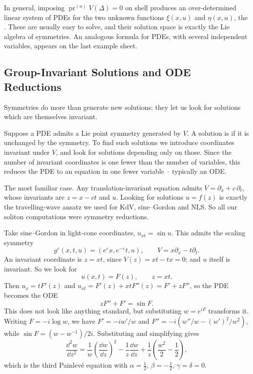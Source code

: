\documentclass[a4paper]{scrartcl}
\newcommand{\pr}{\operatorname{pr}}
\begin{document}
In general, imposing $\pr^{(n)}V(\Delta) = 0$ on shell produces an over-determined linear system of PDEs for the two unknown functions $\xi(x,u)$ and $\eta(x,u)$, the . These are usually easy to solve, and their solution space is exactly the Lie algebra of symmetries. An analogous formula for PDEs, with several independent variables, appears on the last example sheet.

\subsection{Group-Invariant Solutions and ODE Reductions}

Symmetries do more than generate new solutions: they let us look for solutions which are themselves invariant.

Suppose a PDE admits a Lie point symmetry generated by $V$. A solution is  if it is unchanged by the symmetry. To find such solutions we introduce coordinates invariant under $V$, and look for solutions depending only on those. Since the number of invariant coordinates is one fewer than the number of variables, this reduces the PDE to an equation in one fewer variable -- typically an ODE.

\begin{example}
	The most familiar case. Any translation-invariant equation admits $V = \partial_x + c\,\partial_t$, whose invariants are $z = x - ct$ and $u$. Looking for solutions $u = f(z)$ is exactly the travelling-wave ansatz we used for KdV, sine--Gordon and NLS. So all our soliton computations were symmetry reductions.
\end{example}

\begin{example}
	Take sine--Gordon in light-cone coordinates, $u_{xt} = \sin u$. This admits the scaling symmetry
	$$
	g^\varepsilon(x,t,u) = \left(e^\varepsilon x, e^{-\varepsilon}t, u\right), \qquad V = x\partial_x - t\partial_t.
	$$
	An invariant coordinate is $z = xt$, since $V(z) = xt - tx = 0$; and $u$ itself is invariant. So we look for
	$$
	u(x,t) = F(z), \qquad z = xt.
	$$
	Then $u_x = tF'(z)$ and $u_{xt} = F'(z) + xtF''(z) = F' + zF''$, so the PDE becomes the ODE
	$$
	zF'' + F' = \sin F.
	$$
	This does not look like anything standard, but substituting $w = e^{iF}$ transforms it. Writing $F = -i\log w$, we have $F' = -iw'/w$ and $F'' = -i(w''/w - (w')^2/w^2)$, while $\sin F = (w - w^{-1})/2i$. Substituting and simplifying gives
	$$
	\frac{\dd^2w}{\dd z^2} = \frac{1}{w}\left(\frac{\dd w}{\dd z}\right)^2 - \frac1z\frac{\dd w}{\dd z} + \frac{1}{z}\left(\frac{w^2}{2} - \frac12\right),
	$$
	which is the third Painlev\'e equation with $\alpha = \frac12$, $\beta = -\frac12$, $\gamma = \delta = 0$.
\end{example}
\end{document}
